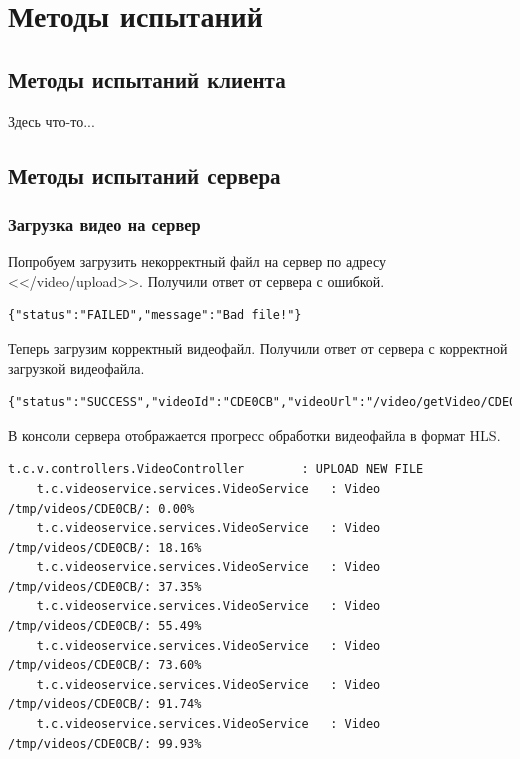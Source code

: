 \documentclass{../../includes/TechDocMultiAuthors}
\begin{document}
    \section{Методы испытаний}

    \subsection{Методы испытаний клиента}

    Здесь что-то...

    \subsection{Методы испытаний сервера}

    \subsubsection{Загрузка видео на сервер}

    Попробуем загрузить некорректный файл на сервер по адресу <</video/upload>>.
    Получили ответ от сервера с ошибкой.

    \begin{lstlisting}[language=text,caption={Ответ сервера при загрузке некорректного файла}]
    {"status":"FAILED","message":"Bad file!"}
    \end{lstlisting}

    Теперь загрузим корректный видеофайл.
    Получили ответ от сервера с корректной загрузкой видеофайла.

    \begin{lstlisting}[language=text,caption={Ответ сервера при загрузке корректного файла}]
    {"status":"SUCCESS","videoId":"CDE0CB","videoUrl":"/video/getVideo/CDE0CB/video.m3u8"}
    \end{lstlisting}

    В консоли сервера отображается прогресс обработки видеофайла в формат HLS.

    \begin{lstlisting}[language=text,caption={Информация об обработке файла в консоли}]
    t.c.v.controllers.VideoController        : UPLOAD NEW FILE
    t.c.videoservice.services.VideoService   : Video /tmp/videos/CDE0CB/: 0.00%
    t.c.videoservice.services.VideoService   : Video /tmp/videos/CDE0CB/: 18.16%
    t.c.videoservice.services.VideoService   : Video /tmp/videos/CDE0CB/: 37.35%
    t.c.videoservice.services.VideoService   : Video /tmp/videos/CDE0CB/: 55.49%
    t.c.videoservice.services.VideoService   : Video /tmp/videos/CDE0CB/: 73.60%
    t.c.videoservice.services.VideoService   : Video /tmp/videos/CDE0CB/: 91.74%
    t.c.videoservice.services.VideoService   : Video /tmp/videos/CDE0CB/: 99.93%
    \end{lstlisting}
\end{document}
